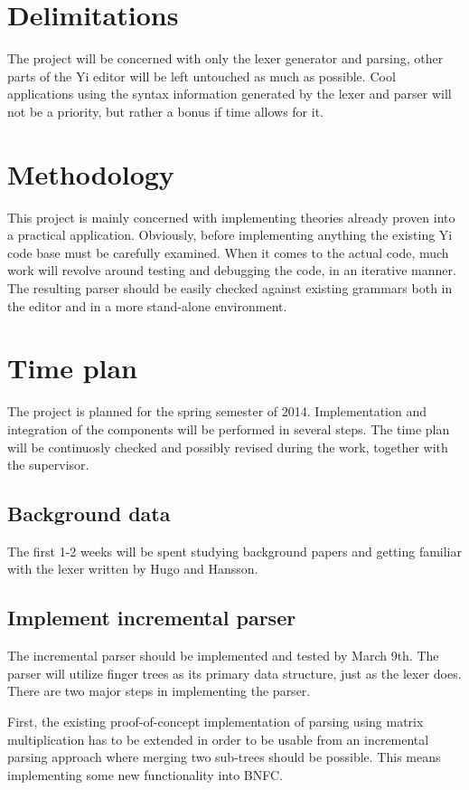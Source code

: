 \documentclass[a4paper,12pt]{article}
\begin{document}
\section*{Delimitations}
The project will be concerned with only the lexer generator and parsing, other
parts of the Yi editor will be left untouched as much as possible. Cool
applications using the syntax information generated by the lexer and parser will
not be a priority, but rather a bonus if time allows for it.

\section*{Methodology}
This project is mainly concerned with implementing theories already proven into
a practical application. Obviously, before implementing anything the existing Yi
code base must be carefully examined. When it comes to the actual code, much
work will revolve around testing and debugging the code, in an iterative manner.
The resulting parser should be easily checked against existing grammars both in
the editor and in a more stand-alone environment. 

\section*{Time plan}
The project is planned for the spring semester of 2014. Implementation and
integration of the components will be performed in several steps. The time plan
will be continuosly checked and possibly revised during the work, together with
the supervisor.

\subsection*{Background data}
The first 1-2 weeks will be spent studying background papers and getting
familiar with the lexer written by Hugo and Hansson. 

\subsection*{Implement incremental parser}
The incremental parser should be implemented and tested by March 9th. The parser
will utilize finger trees as its primary data structure, just as the lexer does.
There are two major steps in implementing the parser.

First, the existing proof-of-concept implementation of parsing using matrix
multiplication has to be extended in order to be usable from an incremental
parsing approach where merging two sub-trees should be possible. This means
implementing some new functionality into BNFC\cite{bnfc}.
\end{document}
